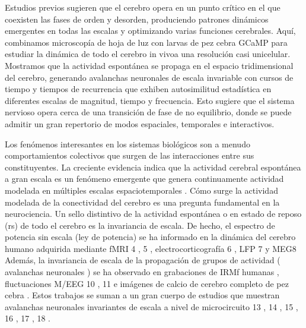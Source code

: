 Estudios previos sugieren que el cerebro opera en un punto crítico en el que coexisten las fases de orden y desorden, produciendo patrones dinámicos emergentes en todas las escalas y optimizando varias funciones cerebrales. Aquí, combinamos microscopía de hoja de luz con larvas de pez cebra GCaMP para estudiar la dinámica de todo el cerebro in vivoa una resolución casi unicelular. Mostramos que la actividad espontánea se propaga en el espacio tridimensional del cerebro, generando avalanchas neuronales de escala invariable con cursos de tiempo y tiempos de recurrencia que exhiben autosimilitud estadística en diferentes escalas de magnitud, tiempo y frecuencia. Esto sugiere que el sistema nervioso opera cerca de una transición de fase de no equilibrio, donde se puede admitir un gran repertorio de modos espaciales, temporales e interactivos.

Los fenómenos interesantes en los sistemas biológicos son a menudo comportamientos colectivos que surgen de las interacciones entre sus constituyentes. La creciente evidencia indica que la actividad cerebral espontánea a gran escala es un fenómeno emergente que genera continuamente actividad modelada en múltiples escalas espaciotemporales \cite{chang_timefrequency_2010}. Cómo surge la actividad modelada de la conectividad del cerebro es una pregunta fundamental en la neurociencia. Un sello distintivo de la actividad espontánea o en estado de reposo (rs) de todo el cerebro es la invariancia de escala. De hecho, el espectro de potencia sin escala (ley de potencia) se ha informado en la dinámica del cerebro humano adquirida mediante fMRI 4 , 5 , electrocorticografía 6 , LFP 7 y MEG8 Además, la invariancia de escala de la propagación de grupos de actividad ( avalanchas neuronales ) se ha observado en grabaciones de IRMf humanas \cite{tagliazucchi_criticality_2012} , fluctuaciones M/EEG 10 , 11 e imágenes de calcio de cerebro completo de pez cebra \cite{ponce-alvarez_whole-brain_2018} . Estos trabajos se suman a un gran cuerpo de estudios que muestran avalanchas neuronales invariantes de escala a nivel de microcircuito 13 , 14 , 15 , 16 , 17 , 18 \cite{ponce-alvarez_critical_2023} .


